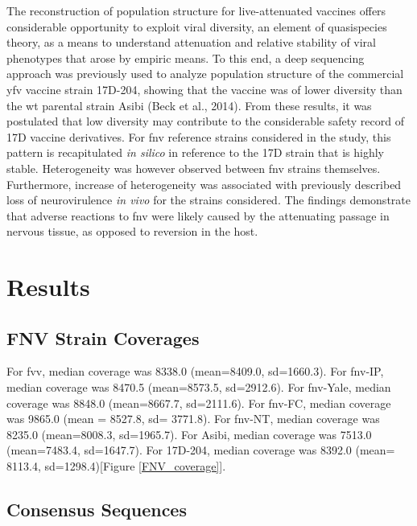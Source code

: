 The reconstruction of population structure for live-attenuated vaccines offers considerable opportunity to exploit viral diversity, an element of quasispecies theory, as a means to understand attenuation and relative stability of viral phenotypes that arose by empiric means. To this end, a deep sequencing approach was previously used to analyze population structure of the commercial \gls{yfv} vaccine strain 17D-204, showing that the vaccine was of lower diversity than the \gls{wt} parental strain Asibi (Beck et al., 2014). From these results, it was postulated that low diversity may contribute to the considerable safety record of 17D vaccine derivatives. For \gls{fnv} reference strains considered in the study, this pattern is recapitulated \emph{in silico} in reference to the 17D strain that is highly stable. Heterogeneity was however observed between \gls{fnv} strains themselves. Furthermore, increase of heterogeneity was associated with previously described loss of neurovirulence \emph{in vivo} for the strains considered. The findings demonstrate that adverse reactions to \gls{fnv} were likely caused by the attenuating passage in nervous tissue, as opposed to reversion in the host. 

\section{Results}
\subsection{FNV Strain Coverages}
For \gls{fvv}, median coverage was 8338.0 (mean=8409.0, \gls{sd}=1660.3). For \gls{fnv}-IP, median coverage was 8470.5 (mean=8573.5, \gls{sd}=2912.6). For \gls{fnv}-Yale, median coverage was 8848.0 (mean=8667.7, \gls{sd}=2111.6). For \gls{fnv}-FC, median coverage was 9865.0 (mean = 8527.8, \gls{sd}= 3771.8). For \gls{fnv}-NT, median coverage was 8235.0 (mean=8008.3, \gls{sd}=1965.7). For Asibi, median coverage was 7513.0 (mean=7483.4, \gls{sd}=1647.7). For 17D-204, median coverage was 8392.0 (mean= 8113.4, \gls{sd}=1298.4)[Figure \ref{FNV_coverage}]. 

\subsection{Consensus Sequences}

